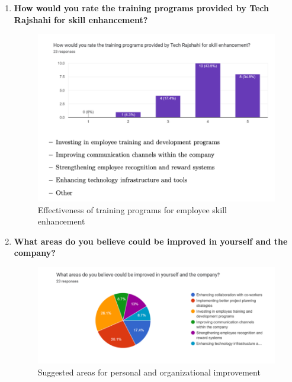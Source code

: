 \documentclass[12pt,a4paper]{article}
\begin{document}
\begin{enumerate}
    \item \textbf{How would you rate the training programs provided by Tech Rajshahi for skill enhancement?}  
    \begin{figure}[H]
        \centering
        \includegraphics[width=\textwidth]{Fig/senh.png}
        \caption{Effectiveness of training programs for employee skill enhancement}
        \label{fig:skill_training}
    \end{figure}

    \item \textbf{What areas do you believe could be improved in yourself and the company?}  
    \begin{figure}[H]
        \centering
        \includegraphics[width=\textwidth]{Fig/imp.png}
        \caption{Suggested areas for personal and organizational improvement}
        \label{fig:improvement_areas}
    \end{figure}


\end{enumerate}
\end{document}
